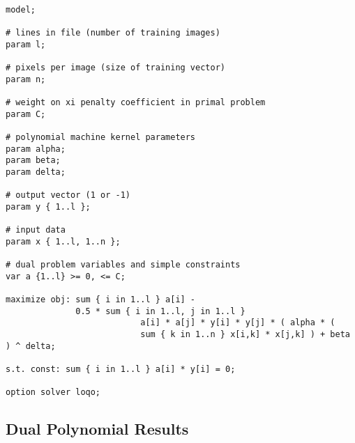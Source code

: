 \documentclass{article}
\begin{document}
\begin{verbatim}

model;

# lines in file (number of training images)
param l;

# pixels per image (size of training vector)
param n;

# weight on xi penalty coefficient in primal problem
param C;

# polynomial machine kernel parameters
param alpha;
param beta;
param delta;

# output vector (1 or -1)
param y { 1..l };

# input data
param x { 1..l, 1..n };

# dual problem variables and simple constraints
var a {1..l} >= 0, <= C;

maximize obj: sum { i in 1..l } a[i] -
              0.5 * sum { i in 1..l, j in 1..l }
                           a[i] * a[j] * y[i] * y[j] * ( alpha * (
                           sum { k in 1..n } x[i,k] * x[j,k] ) + beta ) ^ delta;

s.t. const: sum { i in 1..l } a[i] * y[i] = 0;

option solver loqo;

\end{verbatim}

\subsection{Dual Polynomial Results}
\end{document}
